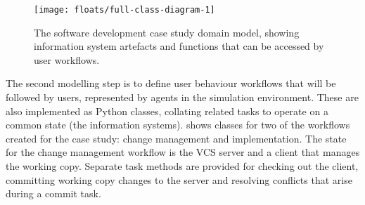 \documentclass{llncs}
\begin{document}
\begin{figure}[t]
  \centering
  \texttt{[image: floats/full-class-diagram-1]}
  \caption{The software development case study domain model, showing information system artefacts and functions that can
    be accessed by user workflows.}
  \label{fig:domain}

\end{figure}

The second modelling step is to define user behaviour workflows that will be followed by users, represented by agents in the simulation environment. These are also implemented as Python classes, collating
related tasks to operate on a common state (the information systems).  shows classes for two of the
workflows created for the case study: change management and implementation.
The state for the change management workflow is the
VCS server and a client that manages the working copy.  Separate task methods are provided for
checking out the client, committing working copy changes to the server and resolving conflicts that arise during a
commit task.
\end{document}
